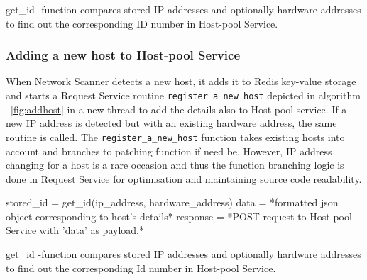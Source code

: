 \begin{center}
\begin{algorithm}[H]
\label{fig:get_id}
\begin{center}
\end{center}
\;
\caption{get\_id -function compares stored IP addresses and optionally hardware addresses to find out the corresponding ID number in Host-pool Service.}
\end{algorithm}
\end{center}

\subsubsection{Adding a new host to Host-pool Service} \label{addtohostpool}

When Network Scanner detects a new host, it adds it to Redis key-value storage and starts a Request Service routine \verb|register_a_new_host| depicted in algorithm ~\ref{fig:addhost} in
a new thread to add the details also to Host-pool service. If a new IP address is detected but with an existing hardware address, the same routine is called. The \verb|register_a_new_host| function takes existing hosts into account and branches to patching function if need be. However, IP address changing for a host is a rare occasion and thus the function branching logic is done in Request Service for optimisation and maintaining source code readability.

\begin{center}
\begin{algorithm}[H]
\label{fig:addhost}
\begin{center}
\end{center}
{
stored\_id = get\_id(ip\_address, hardware\_address)
 {
	data = *formatted json object corresponding to host's details*\;
	response = *POST request to Host-pool Service with 'data' as payload.*\;
} 
}

\caption{get\_id -function compares stored IP addresses and optionally hardware addresses to find out the corresponding Id number in Host-pool Service.}
\end{algorithm}
\end{center}

